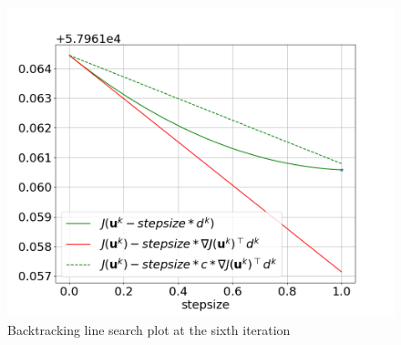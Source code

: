 \begin{figure}
    \centering
    \includegraphics[width=0.8\linewidth]{figs/downward_armijio_6.png}
    \caption{Backtracking line search plot at the sixth iteration}
    \label{fig:downward_armijio_6}
\end{figure}

